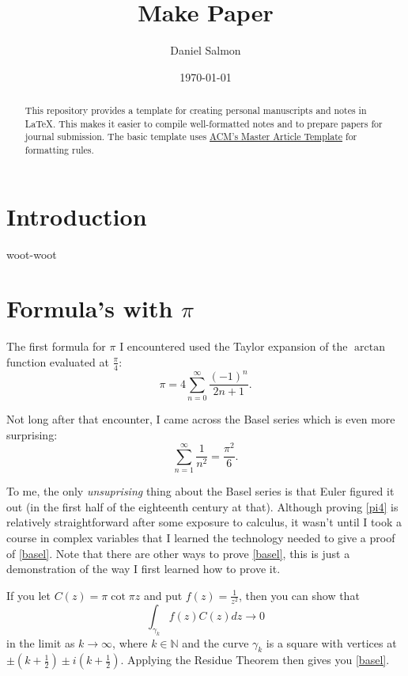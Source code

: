 \documentclass[manuscript,screen,nonacm]{acmart}
\begin{document}
\title{Make Paper}

\author{Daniel Salmon}

\date{\today}

\begin{abstract}
This repository provides a template for creating personal manuscripts
and notes in \LaTeX. This makes it easier to compile well-formatted notes and
to prepare papers for journal submission. The basic template uses
\href{https://www.acm.org/publications/proceedings-template}{ACM's Master
Article Template} for formatting rules.
\end{abstract}

\maketitle

\tableofcontents

\clearpage


\section{Introduction}
\label{sec:intro}

woot-woot

\section{Formula's with $\pi$}

The first formula for $\pi$ I encountered used the Taylor expansion of the
$\arctan$ function evaluated at $\frac{\pi}{4}$:
\begin{equation}\label{pi4}
	\pi=4\sum_{n=0}^{\infty}\frac{(-1)^{n}}{2n + 1}.
\end{equation}

Not long after that encounter, I came across the Basel series which is even
more surprising:
\begin{equation}\label{basel}
	\sum_{n=1}^{\infty}\frac{1}{n^2}=\frac{\pi^2}{6}.
\end{equation}

To me, the only \emph{unsuprising} thing about the Basel series is that Euler
figured it out (in the first half of the eighteenth century at that). Although
proving \eqref{pi4} is relatively straightforward after some exposure to
calculus, it wasn't until I took a course in complex variables that I learned
the technology needed to give a proof of \eqref{basel}. Note that there are
other ways to prove \eqref{basel}, this is just a demonstration of the way I
first learned how to prove it.

If you let $C(z)=\pi\cot{\pi z}$ and put $f(z)=\frac{1}{z^2}$, then you can show that
\begin{equation}
	\int_{\gamma_k}f(z)C(z)dz \rightarrow 0
\end{equation}
in the limit as $k \rightarrow \infty$, where $k \in \mathbb{N}$ and the curve
$\gamma_k$ is a square with vertices at $\pm(k+\frac{1}{2})\pm
i(k+\frac{1}{2})$. Applying the Residue Theorem then gives you \eqref{basel}.
\end{document}
